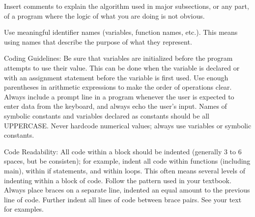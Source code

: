 \documentclass{beamer}
\begin{document}
Insert comments to explain the algorithm used in major subsections, or any part, of a 
program where the logic of what you are doing is not obvious.  

Use meaningful identifier names (variables, function names, etc.). This means using names that 
describe the purpose of what they represent. 

Coding Guidelines:
Be sure that variables are initialized before the program attempts to use their value.  This can be 
done when the variable is declared or with an assignment statement before the variable is first 
used.
Use enough parentheses in arithmetic expressions to make the order of operations clear.
Always include a prompt line in a program whenever the user is expected to enter data from the 
keyboard, and always echo the user’s input.
Names of symbolic constants and variables declared as constants should be all UPPERCASE.
Never hardcode numerical values; always use variables or symbolic
constants.

Code Readability:
All code within a block should be indented (generally 3 to 6 spaces, but be consisten); for 
example, indent all code within functions (including main), within if statements, and within 
loops.  This often means several levels of indenting within a block of code.  Follow the pattern 
used in your textbook.
Always place braces {} on a separate line, indented an equal amount to the previous line of code. 
Further indent all lines of code between brace pairs.  See your text for examples.
\end{document}
